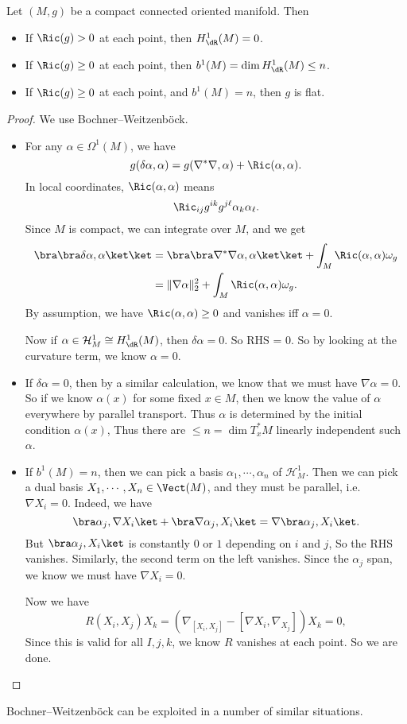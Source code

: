 \documentclass[a4paper]{article}
\begin{document}
\begin{thm}
  Let $(M, g)$ be a compact connected oriented manifold. Then
  \begin{itemize}
    \item If $\Ric(g) > 0$ at each point, then $H_{\dR}^1(M) = 0$.
    \item If $\Ric(g) \geq 0$ at each point, then $b^1(M) = \dim H_{\dR}^1(M) \leq n$.
    \item If $\Ric(g) \geq 0$ at each point, and $b^1(M) = n$, then $g$ is flat.
  \end{itemize}
\end{thm}

\begin{proof}
  We use Bochner--Weitzenb\"ock.
  \begin{itemize}
    \item For any $\alpha \in \Omega^1(M)$, we have
      \[
        g(\delta \alpha, \alpha) = g(\nabla^* \nabla, \alpha) + \Ric(\alpha, \alpha).
      \]
      In local coordinates, $\Ric(\alpha, \alpha)$ means
      \[
        \Ric_{ij} g^{ik} g^{j\ell} \alpha_k \alpha_\ell.
      \]
      Since $M$ is compact, we can integrate over $M$, and we get
      \begin{align*}
        \bra \bra \delta \alpha, \alpha\ket\ket &= \bra \bra \nabla^* \nabla \alpha, \alpha\ket \ket + \int_M \Ric(\alpha, \alpha) \omega_g\\
        &= \|\nabla \alpha\|^2_2 + \int_M \Ric(\alpha, \alpha) \omega_g.
      \end{align*}
      By assumption, we have $\Ric(\alpha, \alpha) \geq 0$ and vanishes iff $\alpha = 0$.

      Now if $\alpha \in \mathcal{H}_M^1 \cong H_{\dR}^1 (M)$, then $\delta \alpha = 0$. So RHS = 0. So by looking at the curvature term, we know $\alpha = 0$.
    \item If $\delta \alpha = 0$, then by a similar calculation, we know that we must have $\nabla \alpha = 0$. So if we know $\alpha(x)$ for some fixed $x \in M$, then we know the value of $\alpha$ everywhere by parallel transport. Thus $\alpha$ is determined by the initial condition $\alpha(x)$, Thus there are $\leq n = \dim T_x^* M$ linearly independent such $\alpha$.
    \item If $b^1(M) = n$, then we can pick a basis $\alpha_1, \cdots, \alpha_n$ of $\mathcal{H}^1_M$. Then we can pick a dual basis $X_1, \cdots, X_n \in \Vect(M)$, and they must be parallel, i.e.\ $\nabla X_i = 0$. Indeed, we have
      \[
        \bra \alpha_j, \nabla X_i\ket + \bra \nabla \alpha_j, X_i\ket = \nabla \bra \alpha_j, X_i\ket.
      \]
      But $\bra \alpha_j, X_i\ket$ is constantly $0$ or $1$ depending on $i$ and $j$, So the RHS vanishes. Similarly, the second term on the left vanishes. Since the $\alpha_j$ span, we know we must have $\nabla X_i = 0$.

      Now we have
      \[
        R(X_i, X_j) X_k = (\nabla_{[X_i, X_j]} - [\nabla X_i, \nabla_{X_j}]) X_k = 0,
      \]
      Since this is valid for all $I, j, k$, we know $R$ vanishes at each point. So we are done.
  \end{itemize}
\end{proof}
Bochner--Weitzenb\"ock can be exploited in a number of similar situations.
\end{document}
